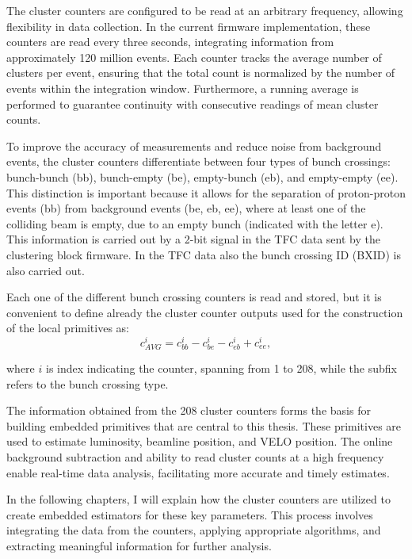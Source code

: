 The cluster counters are configured to be read at an arbitrary frequency, allowing flexibility in data collection. In the current firmware implementation, these counters are read every three seconds, integrating information from approximately 120 million events. 
Each counter tracks the average number of clusters per event, ensuring that the total count is normalized by the number of events within the integration window. Furthermore, a running average is performed to guarantee continuity with consecutive readings of mean cluster counts.

To improve the accuracy of measurements and reduce noise from background events, the cluster counters differentiate between four types of bunch crossings: bunch-bunch (bb), bunch-empty (be), empty-bunch (eb), and empty-empty (ee). This distinction is important because it allows for the separation of proton-proton events (bb) from background events (be, eb, ee), where at least one of the colliding beam is empty, due to an empty bunch (indicated with the letter e). This information is carried out by a 2-bit signal in the TFC data sent by the clustering block firmware. In the TFC data also the bunch crossing ID (BXID) is also carried out.

Each one of the different bunch crossing counters is read and stored, but it is convenient to define already the cluster counter outputs used for the construction of the local primitives as: 
\begin{equation}
    c^i_{AVG} = c^i_{bb} - c^i_{be} - c^i_{eb} + c^i_{ee},
\end{equation}

where $i$ is index indicating the counter, spanning from 1 to 208, while the subfix refers to the bunch crossing type.

The information obtained from the 208 cluster counters forms the basis for building embedded primitives that are central to this thesis. These primitives are used to estimate luminosity, beamline position, and VELO position. The online background subtraction and ability to read cluster counts at a high frequency enable real-time data analysis, facilitating more accurate and timely estimates.

In the following chapters, I will explain how the cluster counters are utilized to create embedded estimators for these key parameters. This process involves integrating the data from the counters, applying appropriate algorithms, and extracting meaningful information for further analysis. 